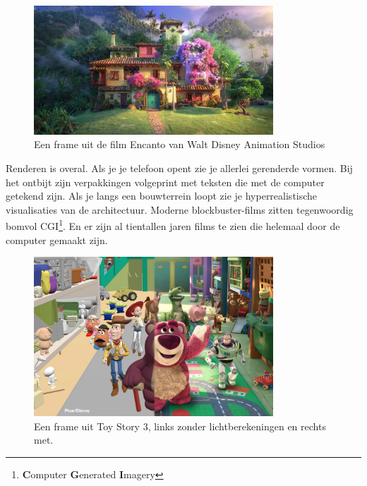 \documentclass[12pt, a4paper]{article}
\begin{document}
\paragraph{}
\begin{figure}[h]
    \centering
    \includegraphics[width=0.8\textwidth]{encanto.jpg}
    \caption{Een frame uit de film Encanto van Walt Disney Animation Studios}
    \label{fig:encanto}
\end{figure}
Renderen is overal. Als je je telefoon opent zie je allerlei gerenderde vormen. Bij het ontbijt zijn verpakkingen volgeprint met teksten die met de computer getekend zijn. Als je langs een bouwterrein loopt zie je hyperrealistische visualisaties van de architectuur. Moderne blockbuster-films zitten tegenwoordig bomvol CGI\footnote{\textbf{C}omputer \textbf{G}enerated \textbf{I}magery}. En er zijn al tientallen jaren films te zien die helemaal door de computer gemaakt zijn. 
\begin{figure}[h]
    \centering
    \includegraphics[width=0.8\textwidth]{toystory3comparison.jpg}
    \caption{Een frame uit Toy Story 3, links zonder lichtberekeningen en rechts met.}
    \label{fig:toystory3}
\end{figure}
\end{document}
